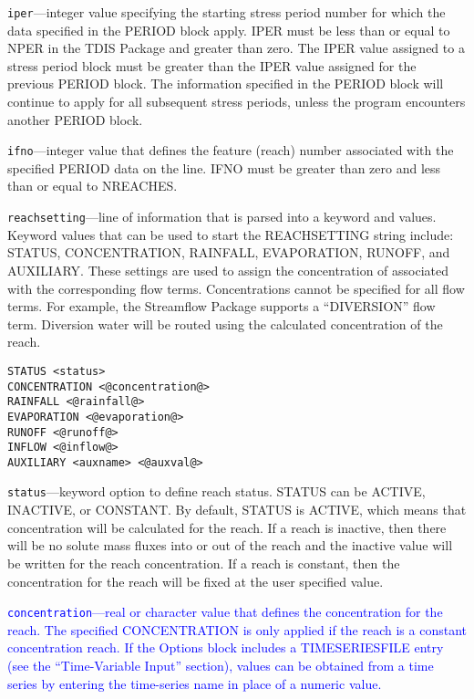 \begin{description}
\item \texttt{iper}---integer value specifying the starting stress period number for which the data specified in the PERIOD block apply.  IPER must be less than or equal to NPER in the TDIS Package and greater than zero.  The IPER value assigned to a stress period block must be greater than the IPER value assigned for the previous PERIOD block.  The information specified in the PERIOD block will continue to apply for all subsequent stress periods, unless the program encounters another PERIOD block.

\item \texttt{ifno}---integer value that defines the feature (reach) number associated with the specified PERIOD data on the line. IFNO must be greater than zero and less than or equal to NREACHES.

\item \texttt{reachsetting}---line of information that is parsed into a keyword and values.  Keyword values that can be used to start the REACHSETTING string include: STATUS, CONCENTRATION, RAINFALL, EVAPORATION, RUNOFF, and AUXILIARY.  These settings are used to assign the concentration of associated with the corresponding flow terms.  Concentrations cannot be specified for all flow terms.  For example, the Streamflow Package supports a ``DIVERSION'' flow term.  Diversion water will be routed using the calculated concentration of the reach.

\begin{lstlisting}[style=blockdefinition]
STATUS <status>
CONCENTRATION <@concentration@>
RAINFALL <@rainfall@>
EVAPORATION <@evaporation@>
RUNOFF <@runoff@>
INFLOW <@inflow@>
AUXILIARY <auxname> <@auxval@> 
\end{lstlisting}

\item \texttt{status}---keyword option to define reach status.  STATUS can be ACTIVE, INACTIVE, or CONSTANT. By default, STATUS is ACTIVE, which means that concentration will be calculated for the reach.  If a reach is inactive, then there will be no solute mass fluxes into or out of the reach and the inactive value will be written for the reach concentration.  If a reach is constant, then the concentration for the reach will be fixed at the user specified value.

\item \textcolor{blue}{\texttt{concentration}---real or character value that defines the concentration for the reach. The specified CONCENTRATION is only applied if the reach is a constant concentration reach. If the Options block includes a TIMESERIESFILE entry (see the ``Time-Variable Input'' section), values can be obtained from a time series by entering the time-series name in place of a numeric value.}


\end{description}
